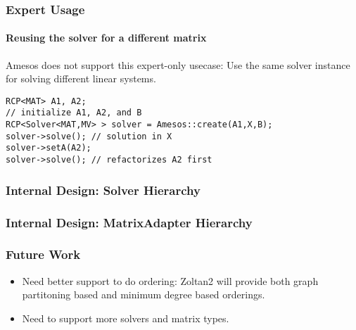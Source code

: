 \documentclass[xcolor=dvipsnames]{beamer}
\begin{document}
\begin{frame}[fragile]
  \frametitle{Expert Usage}
  \framesubtitle{Reusing the solver for a different matrix}
  Amesos does not support this expert-only usecase: Use the same solver instance  for solving different linear systems.
  \begin{lstlisting}
RCP<MAT> A1, A2;
// initialize A1, A2, and B
RCP<Solver<MAT,MV> > solver = Amesos::create(A1,X,B);
solver->solve(); // solution in X
solver->setA(A2);
solver->solve(); // refactorizes A2 first
  \end{lstlisting}
\end{frame}


\begin{frame}
  \frametitle{Internal Design: Solver Hierarchy}
\end{frame}

\begin{frame}
  \frametitle{Internal Design: MatrixAdapter Hierarchy}
\end{frame}

\begin{frame}
  \frametitle{Future Work}
  \begin{itemize}
  \item Need better support to do ordering: Zoltan2 will provide both
    graph partitoning based and minimum degree based orderings.
  \item Need to support more solvers and matrix types.
  \end{itemize}
\end{frame}
\end{document}
